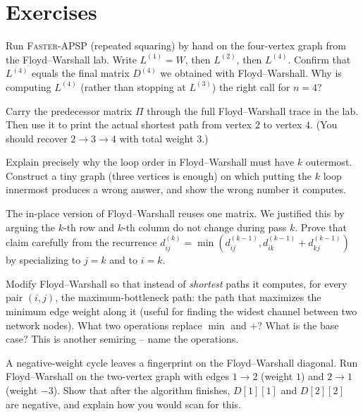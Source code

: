 \section*{Exercises}

\begin{exercise}
Run \textsc{Faster-APSP} (repeated squaring) by hand on the four-vertex graph
from the Floyd--Warshall lab. Write $L^{(1)} = W$, then $L^{(2)}$, then
$L^{(4)}$. Confirm that $L^{(4)}$ equals the final matrix $D^{(4)}$ we obtained
with Floyd--Warshall. Why is computing $L^{(4)}$ (rather than stopping at
$L^{(3)}$) the right call for $n = 4$?
\end{exercise}

\begin{exercise}
Carry the predecessor matrix $\Pi$ through the full Floyd--Warshall trace in the
lab. Then use it to print the actual shortest path from vertex $2$ to vertex
$4$. (You should recover $2 \to 3 \to 4$ with total weight $3$.)
\end{exercise}

\begin{exercise}
Explain precisely why the loop order in Floyd--Warshall must have $k$ outermost.
Construct a tiny graph (three vertices is enough) on which putting the $k$ loop
innermost produces a wrong answer, and show the wrong number it computes.
\end{exercise}

\begin{exercise}
The in-place version of Floyd--Warshall reuses one matrix. We justified this by
arguing the $k$-th row and $k$-th column do not change during pass $k$. Prove
that claim carefully from the recurrence
$d^{(k)}_{ij} = \min(d^{(k-1)}_{ij}, d^{(k-1)}_{ik} + d^{(k-1)}_{kj})$ by
specializing to $j = k$ and to $i = k$.
\end{exercise}

\begin{exercise}
Modify Floyd--Warshall so that instead of \emph{shortest} paths it computes, for
every pair $(i, j)$, the maximum-bottleneck path: the path that maximizes the
minimum edge weight along it (useful for finding the widest channel between two
network nodes). What two operations replace $\min$ and $+$? What is the base
case? This is another semiring -- name the operations.
\end{exercise}

\begin{exercise}
A negative-weight cycle leaves a fingerprint on the Floyd--Warshall diagonal.
Run Floyd--Warshall on the two-vertex graph with edges $1 \to 2$ (weight $1$)
and $2 \to 1$ (weight $-3$). Show that after the algorithm finishes, $D[1][1]$
and $D[2][2]$ are negative, and explain how you would scan for this.
\end{exercise}

